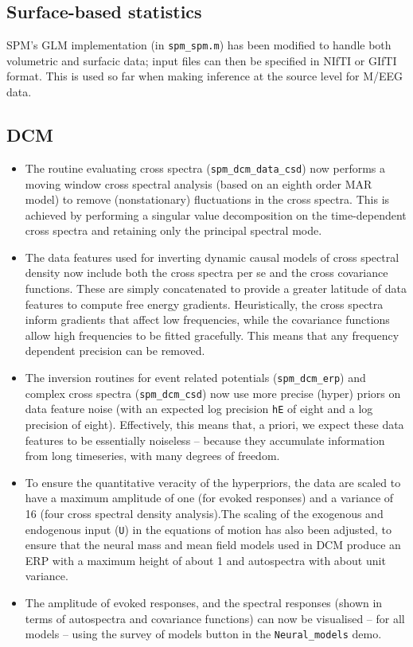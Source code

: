 \documentclass[a4paper,titlepage,openany]{article}
\begin{document}
\subsection{Surface-based statistics}

SPM's GLM implementation (in \texttt{spm\_spm.m}) has been modified to handle both volumetric and surfacic data; input files can then be specified in NIfTI or GIfTI format. This is used so far when making inference at the source level for M/EEG data.

\subsection{DCM}

\begin{itemize}
\item The routine evaluating cross spectra (\texttt{spm\_dcm\_data\_csd}) now performs a moving window cross spectral analysis (based on an eighth order MAR model) to remove (nonstationary) fluctuations in the cross spectra. This is achieved by performing a singular value decomposition on the time-dependent cross spectra and retaining only the principal spectral mode.
\item The data features used for inverting dynamic causal models of cross spectral density now include both the cross spectra per se and the cross covariance functions. These are simply concatenated to provide a greater latitude of data features to compute free energy gradients. Heuristically, the cross spectra inform gradients that affect low frequencies, while the covariance functions allow high frequencies to be fitted gracefully. This means that any frequency dependent precision can be removed.
\item The inversion routines for event related potentials (\texttt{spm\_dcm\_erp}) and complex cross spectra (\texttt{spm\_dcm\_csd}) now use more precise (hyper) priors on data feature noise (with an expected log precision \texttt{hE} of eight and a log precision of eight). Effectively, this means that, a priori, we expect these data features to be essentially noiseless -- because they accumulate information from long timeseries, with many degrees of freedom.
\item To ensure the quantitative veracity of the hyperpriors, the data are scaled to have a maximum amplitude of one (for evoked responses) and a variance of 16 (four cross spectral density analysis).The scaling of the exogenous and endogenous input (\texttt{U}) in the equations of motion has also been adjusted, to ensure that the neural mass and mean field models used in DCM produce an ERP with a maximum height of about 1 and autospectra with about unit variance.
\item The amplitude of evoked responses, and the spectral responses (shown in terms of autospectra and covariance functions) can now be visualised -- for all models -- using the survey of models button in the \texttt{Neural\_models} demo.
\end{itemize}
\end{document}
